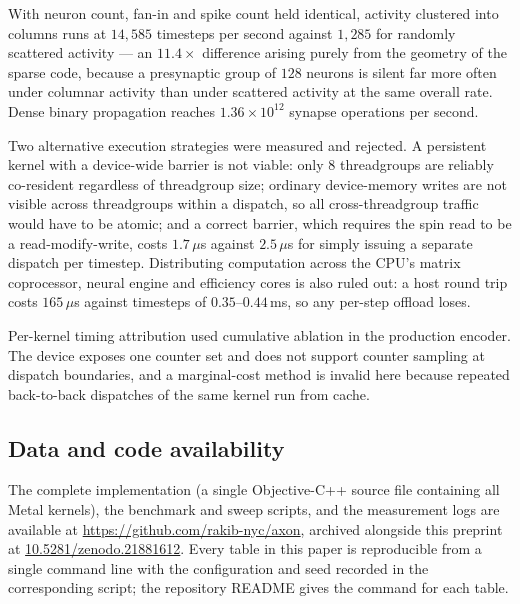 \documentclass[10pt,twocolumn,a4paper]{article}
\newcommand{\doilink}{10.5281/zenodo.21881612}
\begin{document}
With neuron count, fan-in and spike count held identical, activity clustered into columns
runs at $14{,}585$ timesteps per second against $1{,}285$ for randomly scattered activity
--- an $11.4\times$ difference arising purely from the geometry of the sparse code, because
a presynaptic group of $128$ neurons is silent far more often under columnar activity than
under scattered activity at the same overall rate. Dense binary propagation reaches
$1.36\times10^{12}$ synapse operations per second.

Two alternative execution strategies were measured and rejected. A persistent kernel with a
device-wide barrier is not viable: only $8$ threadgroups are reliably co-resident regardless
of threadgroup size; ordinary device-memory writes are not visible across threadgroups
within a dispatch, so all cross-threadgroup traffic would have to be atomic; and a correct
barrier, which requires the spin read to be a read-modify-write, costs $1.7\,\mu$s against
$2.5\,\mu$s for simply issuing a separate dispatch per timestep. Distributing computation
across the CPU's matrix coprocessor, neural engine and efficiency cores is also ruled out:
a host round trip costs $165\,\mu$s against timesteps of $0.35$--$0.44$\,ms, so any per-step
offload loses.

Per-kernel timing attribution used cumulative ablation in the production encoder. The
device exposes one counter set and does not support counter sampling at dispatch
boundaries, and a marginal-cost method is invalid here because repeated back-to-back
dispatches of the same kernel run from cache.

\subsection{Data and code availability}

The complete implementation (a single Objective-C++ source file containing all Metal
kernels), the benchmark and sweep scripts, and the measurement logs are available at
\url{https://github.com/rakib-nyc/axon}, archived alongside this preprint at
\href{https://doi.org/\doilink}{\doilink}. Every table in this paper is reproducible from a
single command line with the configuration and seed recorded in the corresponding script;
the repository README gives the command for each table.
\end{document}
